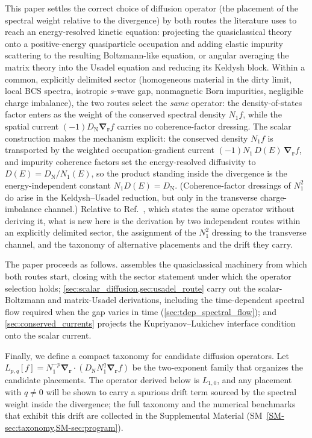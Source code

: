 \documentclass[
  aps,
  prb,
  preprint,
  superscriptaddress,
  longbibliography,
  nofootinbib
]{revtex4-2}
\newcommand{\br}{\mathbf{r}}
\newcommand{\bnabla}{\boldsymbol{\nabla}}
\newcommand{\DOS}{N_1}
\newcommand{\DN}{D_{\mathrm{N}}}
\newcommand{\DE}{D(E)}
\begin{document}
This paper settles the correct choice of diffusion operator (the placement of the spectral weight relative to the divergence) by both
routes the literature uses to reach an energy-resolved kinetic
equation: projecting the quasiclassical theory onto a positive-energy
quasiparticle occupation and adding elastic impurity scattering to the
resulting Boltzmann-like equation, or angular averaging the matrix
theory into the Usadel equation and reducing its Keldysh block. Within
a common, explicitly delimited sector (homogeneous material in the
dirty limit, local BCS spectra, isotropic \(s\)-wave gap, nonmagnetic
Born impurities, negligible charge imbalance), the two routes select the \emph{same}
operator: the density-of-states factor enters as the weight of the
conserved spectral density \(\DOS f\), while the spatial current
\((-1)\DN\bnabla_{\br}f\) carries no coherence-factor dressing. The
scalar construction makes the mechanism explicit: the conserved
density \(\DOS f\) is transported by the weighted occupation-gradient
current \((-1)\DOS\,\DE\,\bnabla_{\br}f\), and impurity coherence factors
set the energy-resolved diffusivity to \(\DE=\DN/\DOS(E)\), so the
product standing inside the divergence is the energy-independent
constant \(\DOS\DE=\DN\). (Coherence-factor dressings of \(\DOS^{2}\)
do arise in the Keldysh--Usadel reduction, but only in the transverse
charge-imbalance channel.) Relative to
Ref.~, which states the same operator without
deriving it, what is new here is the derivation by two independent routes
within an explicitly delimited sector, the assignment of the \(\DOS^{2}\)
dressing to the transverse channel, and the taxonomy of alternative
placements and the drift they carry. 

The paper proceeds as follows.  assembles
the quasiclassical machinery from which both routes start, closing
with the sector statement under which the operator selection holds;
\cref{sec:scalar_diffusion,sec:usadel_route} carry out the
scalar-Boltzmann and matrix-Usadel derivations, including the
time-dependent spectral flow required when the gap varies in time
(\cref{sec:tdep_spectral_flow}); and
\cref{sec:conserved_currents} projects the Kupriyanov--Lukichev
interface condition onto the scalar current.

Finally, we define a compact taxonomy for candidate diffusion operators. 
Let \(L_{p,q}[f]=\DOS^{-p}\bnabla_{\br}\cdot(\DN\DOS^{q}\bnabla_{\br}f)\) be the two-exponent family
that organizes the candidate placements. The operator derived below is 
\(L_{1,0}\), and any placement with \(q\neq0\) will be shown to carry
a spurious drift term sourced by the spectral weight inside the divergence;
the full taxonomy and the numerical benchmarks that exhibit this drift
are collected in the Supplemental Material
(SM~\cref{SM-sec:taxonomy,SM-sec:program}).
\end{document}

